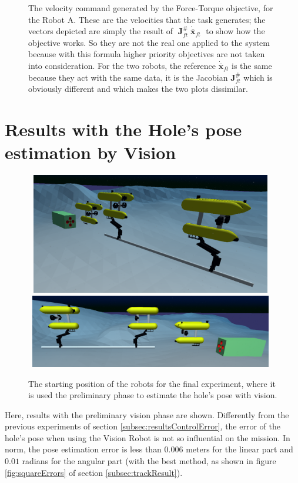 \begin{figure}[H]
	\caption[Plots of the velocity command generated by the Force-Torque objective]{The velocity command generated by the Force-Torque objective, for the Robot A. These are the velocities that the task generates; the vectors depicted are simply the result of $\; \boldsymbol{J}^{\#}_{ft} \; \dot{\bar{\boldsymbol{x}}}_{ft}\;$ to show how the objective works. So they are not the real one applied to the system because with this formula higher priority objectives are not taken into consideration. For the two robots, the reference $\dot{\bar{\boldsymbol{x}}}_{ft}$ is the same because they act with the same data, it is the Jacobian $\boldsymbol{J}^{\#}_{ft}$ which is obviously different and which makes the two plots dissimilar.}
	\label{fig:forceTaskVelocities}
\end{figure}


\section{Results with the Hole's pose estimation by Vision}
\label{sec:finalTest}
\begin{figure}[H]
	\centering
	\includegraphics[width=11cm, height=5.3cm]{uwsim_scenario_all0.png}
	\includegraphics[width=11cm, height=3.2cm]{uwsim_scenario_all1.png}
	
	\caption[Scenatio for the final test with Vision]{The starting position of the robots for the final experiment, where it is used the preliminary phase to estimate the hole's pose with vision.}
	\label{fig:uwsim_expAll}
\end{figure}
Here, results with the preliminary vision phase are shown. Differently from the previous experiments of section \ref{subsec:resultsControlError}, the error of the hole's pose when using the Vision Robot is not so influential on the mission. In norm, the pose estimation error is less than $0.006$ meters for the linear part and $0.01$ radians for the angular part (with the best method, as shown in figure \ref{fig:squareErrors} of section \ref{subsec:trackResult}).\\ 
